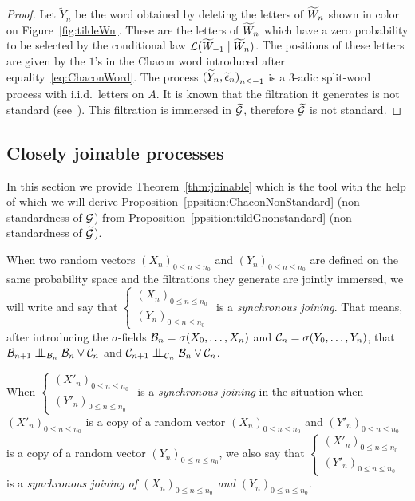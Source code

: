 \documentclass[12pt,a4paper]{article}
\begin{document}
\begin{proof}
Let $\widetilde{Y}_n$ be the word obtained by deleting the letters of $\widetilde{W}_n$ 
shown in color on Figure~\ref{fig:tildeWn}. 
These are the letters of $\widetilde{W}_n$ which have a zero probability to be selected 
by the conditional law ${\cal L}(\widetilde{W}_{-1} \mid \widetilde{W}_n)$. 
The positions of these letters are given by the $1$'s in the Chacon word 
introduced after equality~\eqref{eq:ChaconWord}. 
The process ${(\widetilde{Y}_n, \widetilde{\epsilon}_n)}_{n \leq -1}$ is a $3$-adic 
split-word process with i.i.d.\ letters on $A$. 
It is known that the filtration it generates is not standard 
(see~\cite{Ceil, LauXLIII, LauXLV}). 
This filtration is immersed in $\widetilde{\mathcal{G}}$, therefore $\widetilde{\mathcal{G}}$ is not standard.
\end{proof}


\subsection{Closely joinable processes}\label{sec:joinable}

In this section we provide Theorem~\ref{thm:joinable} which is the tool 
with the help of which we will derive Proposition~\ref{ppsition:ChaconNonStandard} 
(non-standardness of $\mathcal{G}$) from Proposition~\ref{ppsition:tildGnonstandard} 
(non-standardness of $\widetilde{\mathcal{G}}$).


When two random vectors 
${(X_n)}_{0 \leq n \leq n_0}$ and ${(Y_n)}_{0 \leq n \leq n_0}$ are defined 
on the same probability space and the filtrations they generate are 
jointly immersed, we will write and say that 
$\left\{\begin{smallmatrix} {(X_n)}_{0 \leq n \leq n_0} \\ 
{(Y_n)}_{0 \leq n \leq n_0}
\end{smallmatrix}\right.$  is a \emph{synchronous joining}. 
That means, after introducing the $\sigma$-fields 
$\mathcal{B}_n = \sigma(X_{0}, \ldots, X_n)$ and  
$\mathcal{C}_n = \sigma(Y_{0}, \ldots, Y_n)$, that 
$\BB_{n+1} \indep_{\BB_n} \BB_n \vee \CC_n$ 
and $\CC_{n+1} \indep_{\CC_n} \BB_n \vee \CC_n$.  

When $\left\{\begin{smallmatrix} {(X'_n)}_{0 \leq n \leq n_0} \\ 
{(Y'_n)}_{0 \leq n \leq n_0}
\end{smallmatrix}\right.$  is a \emph{synchronous joining} in the situation when 
${(X'_n)}_{0 \leq n \leq n_0}$ is a copy of a random vector 
${(X_n)}_{0 \leq n \leq n_0}$  and ${(Y'_n)}_{0 \leq n \leq n_0}$ 
is a copy of a random vector ${(Y_n)}_{0 \leq n \leq n_0}$, we also say that 
$\left\{\begin{smallmatrix} {(X'_n)}_{0 \leq n \leq n_0} \\ 
{(Y'_n)}_{0 \leq n \leq n_0}
\end{smallmatrix}\right.$  is a \emph{synchronous joining of 
${(X_n)}_{0 \leq n \leq n_0}$ and ${(Y_n)}_{0 \leq n \leq n_0}$}. 
\end{document}
